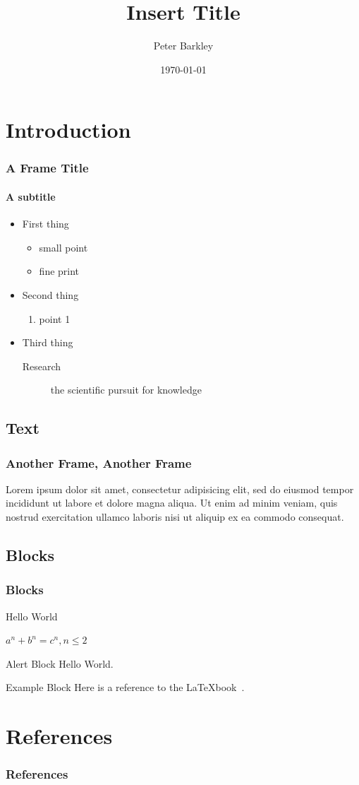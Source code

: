 \documentclass{beamer}
\title{Insert Title}
\author{Peter Barkley}
\date{\today}
\institute[\sc www.nps.edu]{Naval Postgraduate School}
\begin{document}
\begin{frame}[plain,t]
\titlepage
\end{frame}


\section{Introduction}
\begin{frame}
\frametitle{A Frame Title}
\framesubtitle{A subtitle}
\begin{itemize}
\item First thing
	\begin{itemize}
	\item small point
	\item fine print
	\end{itemize}
\item Second thing
	\begin{enumerate}
	\item point 1
	\end{enumerate}
\item Third thing
	\begin{description}
	\item[Research] the scientific pursuit for knowledge
	\end{description}
\end{itemize}
\end{frame}


\subsection{Text}
\begin{frame}
\frametitle{Another Frame, Another Frame}
Lorem ipsum dolor sit amet, consectetur adipisicing elit, sed do eiusmod tempor incididunt ut labore et dolore magna aliqua. Ut enim ad minim veniam, quis nostrud exercitation ullamco laboris nisi ut aliquip ex ea commodo consequat.
\end{frame}



\subsection{Blocks}
\begin{frame}
\frametitle{Blocks}
\begin{definition}[Greetings]
Hello World
\end{definition}

\begin{theorem}[Theorem]
$a^n + b^n = c^n, n \leq 2$
\end{theorem}

\begin{alertblock}{Alert Block}
Hello World.
\end{alertblock}

\begin{exampleblock}{Example Block}
Here is a reference to the \LaTeX book~\cite{texbook}.
\end{exampleblock}
\end{frame}


%
%
\section{References}
\begin{frame}
\frametitle{References}


\end{frame}
\end{document}
